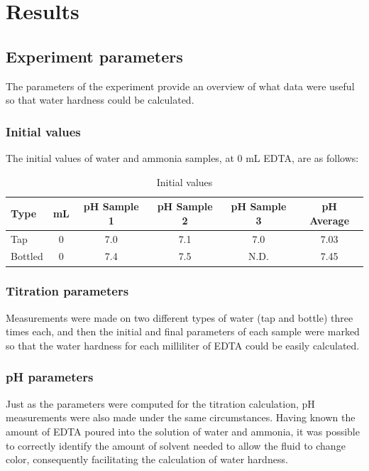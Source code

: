 \documentclass{article}
\begin{document}
\section{Results}
\subsection{Experiment parameters}
The parameters of the experiment provide an overview of what data were useful so that
water hardness could be calculated.

\subsubsection{Initial values}
The initial values of water and ammonia samples, at 0 mL EDTA, are as follows:
\vspace*{.3cm}
\begin{table}[h!]
    \caption{Initial values}
    \centering
        \begin{tabular}{@{}lccccc@{}}
            \toprule
            \textbf{Type} & \textbf{mL} & \textbf{pH Sample 1} & \textbf{pH Sample 2} & \textbf{pH Sample 3} & \textbf{pH Average}\\ \midrule
            Tap & 0 & 7.0 & 7.1 & 7.0 & 7.03\\
            Bottled & 0 & 7.4 & 7.5 & N.D. & 7.45\\ \bottomrule
        \end{tabular}
    \label{tab:initial-values}
\end{table}

\subsubsection{Titration parameters}
Measurements were made on two different types of water (tap and bottle) three times each,
and then the initial and final parameters of each sample were marked so that the water
hardness for each milliliter of EDTA could be easily calculated.

\subsubsection{pH parameters}
Just as the parameters were computed for the titration calculation, pH measurements were
also made under the same circumstances. Having known the amount of EDTA poured into the
solution of water and ammonia, it was possible to correctly identify the amount of solvent
needed to allow the fluid to change color, consequently facilitating the calculation of
water hardness.
\end{document}
